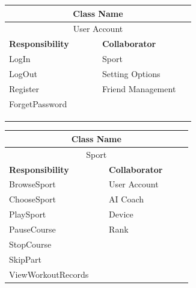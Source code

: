 \documentclass[a4paper]{article}
\begin{document}
	\noindent\begin{minipage}{\textwidth}
		\begin{minipage}[t]{0.48\textwidth}
	 	\centering
		\makeatletter{}\makeatother\caption*{}
		  	\begin{tabular}{|p{0.44\linewidth}|p{0.44\linewidth}|} 
	   			\hline
				\multicolumn{2}{|c|}{\textbf{Class Name}} \\
				\hline
				\multicolumn{2}{|c|}{User Account} \\
				\hline
				\textbf{Responsibility} & \textbf{Collaborator} \\
				\hline
				LogIn & Sport\\
				LogOut & Setting Options\\
				Register & Friend Management\\
				ForgetPassword & \\
				& \\
				& \\
				& \\
				\hline
	   		\end{tabular}
	 	\end{minipage}
	 	\begin{minipage}[t]{0.48\textwidth}
		\centering
		\makeatletter{}\makeatother\caption*{}
			\begin{tabular}{|p{0.48\linewidth}|p{0.40\linewidth}|} 
				\hline
				\multicolumn{2}{|c|}{\textbf{Class Name}} \\
				\hline
				\multicolumn{2}{|c|}{Sport} \\
				\hline
				\textbf{Responsibility} & \textbf{Collaborator} \\
				\hline
				BrowseSport & User Account\\
				ChooseSport & AI Coach \\
				PlaySport & Device \\
				PauseCourse & Rank \\
				StopCourse & \\
				SkipPart & \\
				ViewWorkoutRecords& \\
				\hline
			\end{tabular}
		\end{minipage}
	\end{minipage}
\end{document}
